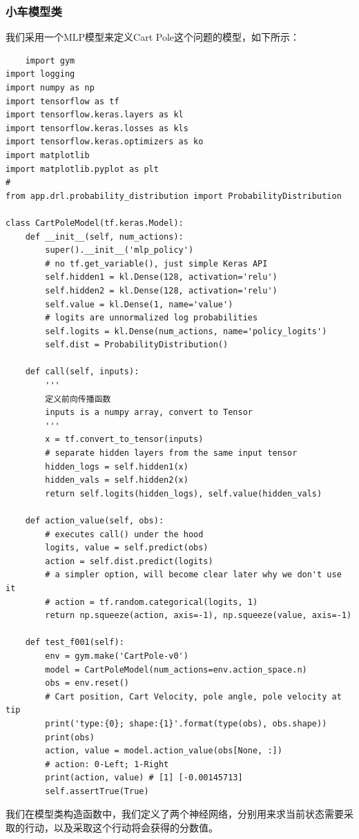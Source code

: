 \documentclass{article}
\begin{document}
\subsubsection{小车模型类}
我们采用一个MLP模型来定义Cart Pole这个问题的模型，如下所示：
\begin{lstlisting}
    import gym
import logging
import numpy as np
import tensorflow as tf
import tensorflow.keras.layers as kl
import tensorflow.keras.losses as kls
import tensorflow.keras.optimizers as ko
import matplotlib
import matplotlib.pyplot as plt
#
from app.drl.probability_distribution import ProbabilityDistribution

class CartPoleModel(tf.keras.Model):
    def __init__(self, num_actions):
        super().__init__('mlp_policy')
        # no tf.get_variable(), just simple Keras API
        self.hidden1 = kl.Dense(128, activation='relu')
        self.hidden2 = kl.Dense(128, activation='relu')
        self.value = kl.Dense(1, name='value')
        # logits are unnormalized log probabilities
        self.logits = kl.Dense(num_actions, name='policy_logits')
        self.dist = ProbabilityDistribution()

    def call(self, inputs):
        ''' 
        定义前向传播函数
        inputs is a numpy array, convert to Tensor
        '''
        x = tf.convert_to_tensor(inputs)
        # separate hidden layers from the same input tensor
        hidden_logs = self.hidden1(x)
        hidden_vals = self.hidden2(x)
        return self.logits(hidden_logs), self.value(hidden_vals)

    def action_value(self, obs):
        # executes call() under the hood
        logits, value = self.predict(obs)
        action = self.dist.predict(logits)
        # a simpler option, will become clear later why we don't use it
        # action = tf.random.categorical(logits, 1)
        return np.squeeze(action, axis=-1), np.squeeze(value, axis=-1)

    def test_f001(self):
        env = gym.make('CartPole-v0')
        model = CartPoleModel(num_actions=env.action_space.n)
        obs = env.reset()
        # Cart position, Cart Velocity, pole angle, pole velocity at tip
        print('type:{0}; shape:{1}'.format(type(obs), obs.shape))
        print(obs)
        action, value = model.action_value(obs[None, :])
        # action: 0-Left; 1-Right
        print(action, value) # [1] [-0.00145713]
        self.assertTrue(True)
\end{lstlisting}
我们在模型类构造函数中，我们定义了两个神经网络，分别用来求当前状态需要采取的行动，以及采取这个行动将会获得的分数值。\newline
\end{document}
